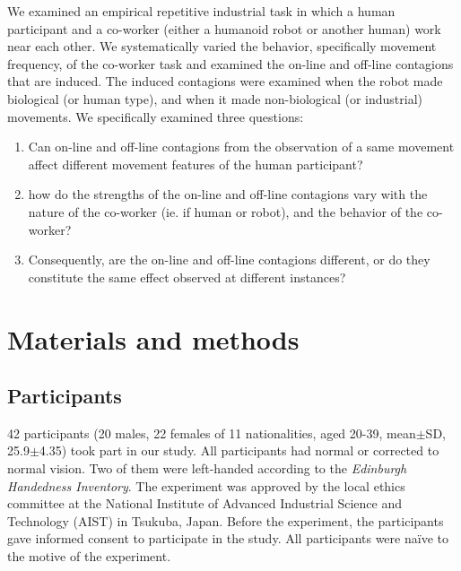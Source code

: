 We examined an empirical repetitive industrial task in which a human participant and a co-worker (either a humanoid robot or another human) work near each other. We systematically varied the behavior, specifically movement frequency, of the co-worker task and examined the on-line and off-line contagions that are induced. The induced contagions were examined when the robot made biological (or human type), and when it made non-biological (or industrial) movements. We specifically examined three questions:

\begin{enumerate}
	\item Can on-line and off-line contagions from the observation of a same movement affect different movement features of the human participant?
	\item how do the strengths of the on-line and off-line contagions vary with the nature of the co-worker (ie. if human or robot), and the behavior of the co-worker?
	\item Consequently, are the on-line and off-line contagions different, or do they constitute the same effect observed at different instances?
\end{enumerate}





\clearpage
\section{Materials and methods}

\subsection{Participants}

42 participants (20 males, 22 females of 11 nationalities, aged 20-39, mean$\pm$SD, 25.9$\pm$4.35) took part in our study. All participants had normal or corrected to normal vision. Two of them were left-handed according to the {\it Edinburgh Handedness Inventory}. The experiment was approved by the local ethics committee at the National Institute of Advanced Industrial Science and Technology (AIST) in Tsukuba, Japan. Before the experiment, the participants gave informed consent to participate in the study. All participants were na{\"i}ve to the motive of the experiment. 

